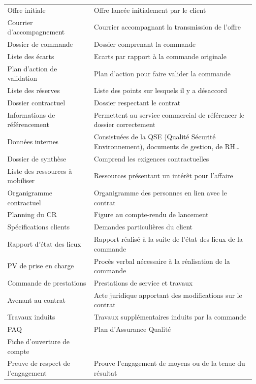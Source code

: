 \begin{table}[H]
\begin{tabular}{p{5.5cm}|p{10cm}}
        Offre initiale & Offre lancée initialement par le client \\
        Courrier d’accompagnement & Courrier accompagnant la transmission de l’offre \\
        Dossier de commande & Dossier comprenant la commande \\
        Liste des écarts & Ecarts par rapport à la commande originale \\
        Plan d’action de validation & Plan d’action pour faire valider la commande \\
        Liste des réserves & Liste des points sur lesquels il y a désaccord \\ 
        Dossier contractuel & Dossier respectant le contrat \\
        Informations de référencement & Permettent au service commercial de référencer le dossier correctement \\
        Données internes & Consistuées de la QSE (Qualité Sécurité Environnement), documents de gestion, de RH\dots \\
        Dossier de synthèse & Comprend les exigences contractuelles \\
        Liste des ressources à mobiliser & Ressources présentant un intérêt pour l’affaire \\
        Organigramme contractuel & Organigramme des personnes en lien avec le contrat \\ 
        Planning du CR & Figure au compte-rendu de lancement \\
        Spécifications clients & Demandes particulières du client \\
        Rapport d’état des lieux & Rapport réalisé à la suite de l’état des lieux de la commande \\
        PV de prise en charge & Procès verbal nécessaire à la réalisation de la commande \\
        Commande de prestations & Prestations de service et travaux \\
        Avenant au contrat & Acte juridique apportant des modifications sur le contrat \\
        Travaux induits & Travaux supplémentaires induits par la commande \\
        PAQ & Plan d’Assurance Qualité \\
        Fiche d’ouverture de compte & \\
        Preuve de respect de l’engagement & Prouve l’engagement de moyens ou de la tenue du résultat \\

\end{tabular}
\end{table}
